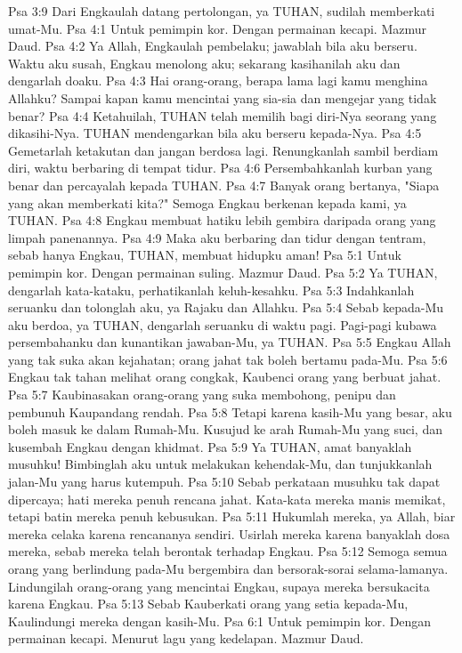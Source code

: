 Psa 3:9  Dari Engkaulah datang pertolongan, ya TUHAN, sudilah memberkati umat-Mu.
Psa 4:1  Untuk pemimpin kor. Dengan permainan kecapi. Mazmur Daud.
Psa 4:2  Ya Allah, Engkaulah pembelaku; jawablah bila aku berseru. Waktu aku susah, Engkau menolong aku; sekarang kasihanilah aku dan dengarlah doaku.
Psa 4:3  Hai orang-orang, berapa lama lagi kamu menghina Allahku? Sampai kapan kamu mencintai yang sia-sia dan mengejar yang tidak benar?
Psa 4:4  Ketahuilah, TUHAN telah memilih bagi diri-Nya seorang yang dikasihi-Nya. TUHAN mendengarkan bila aku berseru kepada-Nya.
Psa 4:5  Gemetarlah ketakutan dan jangan berdosa lagi. Renungkanlah sambil berdiam diri, waktu berbaring di tempat tidur.
Psa 4:6  Persembahkanlah kurban yang benar dan percayalah kepada TUHAN.
Psa 4:7  Banyak orang bertanya, "Siapa yang akan memberkati kita?" Semoga Engkau berkenan kepada kami, ya TUHAN.
Psa 4:8  Engkau membuat hatiku lebih gembira daripada orang yang limpah panenannya.
Psa 4:9  Maka aku berbaring dan tidur dengan tentram, sebab hanya Engkau, TUHAN, membuat hidupku aman!
Psa 5:1  Untuk pemimpin kor. Dengan permainan suling. Mazmur Daud.
Psa 5:2  Ya TUHAN, dengarlah kata-kataku, perhatikanlah keluh-kesahku.
Psa 5:3  Indahkanlah seruanku dan tolonglah aku, ya Rajaku dan Allahku.
Psa 5:4  Sebab kepada-Mu aku berdoa, ya TUHAN, dengarlah seruanku di waktu pagi. Pagi-pagi kubawa persembahanku dan kunantikan jawaban-Mu, ya TUHAN.
Psa 5:5  Engkau Allah yang tak suka akan kejahatan; orang jahat tak boleh bertamu pada-Mu.
Psa 5:6  Engkau tak tahan melihat orang congkak, Kaubenci orang yang berbuat jahat.
Psa 5:7  Kaubinasakan orang-orang yang suka membohong, penipu dan pembunuh Kaupandang rendah.
Psa 5:8  Tetapi karena kasih-Mu yang besar, aku boleh masuk ke dalam Rumah-Mu. Kusujud ke arah Rumah-Mu yang suci, dan kusembah Engkau dengan khidmat.
Psa 5:9  Ya TUHAN, amat banyaklah musuhku! Bimbinglah aku untuk melakukan kehendak-Mu, dan tunjukkanlah jalan-Mu yang harus kutempuh.
Psa 5:10  Sebab perkataan musuhku tak dapat dipercaya; hati mereka penuh rencana jahat. Kata-kata mereka manis memikat, tetapi batin mereka penuh kebusukan.
Psa 5:11  Hukumlah mereka, ya Allah, biar mereka celaka karena rencananya sendiri. Usirlah mereka karena banyaklah dosa mereka, sebab mereka telah berontak terhadap Engkau.
Psa 5:12  Semoga semua orang yang berlindung pada-Mu bergembira dan bersorak-sorai selama-lamanya. Lindungilah orang-orang yang mencintai Engkau, supaya mereka bersukacita karena Engkau.
Psa 5:13  Sebab Kauberkati orang yang setia kepada-Mu, Kaulindungi mereka dengan kasih-Mu.
Psa 6:1  Untuk pemimpin kor. Dengan permainan kecapi. Menurut lagu yang kedelapan. Mazmur Daud.
